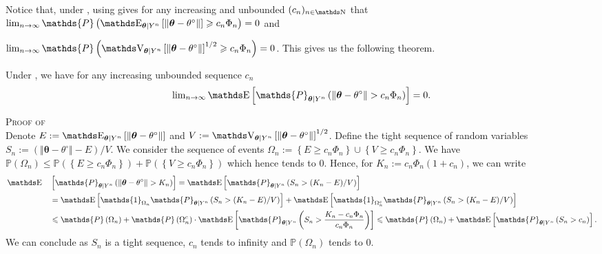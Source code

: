 Notice that, under , using  gives for any increasing and unbounded $(c_{n})_{n \in \N}$ that $\lim\nolimits_{n \rightarrow \infty} \mathds{P}\left(\E_{\boldsymbol{\theta} \vert Y^{n}}\left[\Vert \boldsymbol{\theta} - \theta^{\circ} \Vert \right] \geq c_{n}\Phi_{n}\right) = 0$ and

$\lim\nolimits_{n \rightarrow \infty} \mathds{P}\left(\V_{\boldsymbol{\theta} \vert Y^{n}}\left[\Vert \boldsymbol{\theta} - \theta^{\circ} \Vert \right]^{1/2} \geq c_{n}\Phi_{n}\right) = 0$.
This gives us the following theorem.

\begin{thm}\label{THM_BAYES_STRATEGIES_MOMENT}
Under , we have for any increasing unbounded sequence $c_{n}$
\[\lim\nolimits_{n \rightarrow \infty} \E\left[\mathds{P}_{\boldsymbol{\theta} \vert Y^{n}}\left(\Vert \boldsymbol{\theta} - \theta^{\circ} \Vert > c_{n}\Phi_{n} \right)\right] = 0.\]
\end{thm}

\begin{pro}\label{PRO_BAYES_STRATEGIES_MOMENT}{\textsc{Proof of }\\}
Denote $E := \E_{\boldsymbol{\theta} \vert Y^{n}}\left[\Vert \boldsymbol{\theta} - \theta^{\circ} \Vert\right]$ and $V := \V_{\boldsymbol{\theta} \vert Y^{n}}\left[\Vert \boldsymbol{\theta} - \theta^{\circ} \Vert\right]^{1/2}$.
Define the tight sequence of random variables $S_{n} := (\Vert \boldsymbol{\theta} - \theta^{\circ} \Vert - E)/V$.
We consider the sequence of events $\Omega_{n} := \left\{E \geq c_{n} \Phi_{n}\right\} \cup \left\{V \geq c_{n} \Phi_{n}\right\}$.
We have $\mathds{P}(\Omega_{n}) \leq \mathds{P}\left(\left\{E \geq c_{n} \Phi_{n}\right\}\right) + \mathds{P}\left(\left\{V \geq c_{n} \Phi_{n}\right\}\right)$ which hence tends to $0$.
Hence, for $K_{n} := c_{n} \Phi_{n} (1 + c_{n})$, we can write
\begin{alignat*}{2}
& \E && \left[\mathds{P}_{\boldsymbol{\theta} \vert Y^{n}}\left(\Vert \boldsymbol{\theta} - \theta^{\circ} \Vert > K_{n} \right)\right] = \E\left[\mathds{P}_{\boldsymbol{\theta} \vert Y^{n}}\left(S_{n} > (K_{n} - E)/V \right)\right]\\
& && = \E\left[\mathds{1}_{\Omega_{n}}\mathds{P}_{\boldsymbol{\theta} \vert Y^{n}}\left(S_{n} > (K_{n} - E)/V \right)\right] + \E\left[\mathds{1}_{\Omega_{n}^{c}}\mathds{P}_{\boldsymbol{\theta} \vert Y^{n}}\left(S_{n} > (K_{n} - E)/V \right)\right]\\
& && \leq \mathds{P}\left(\Omega_{n}\right) + \mathds{P}\left(\Omega_{n}^{c}\right) \cdot \E\left[\mathds{P}_{\boldsymbol{\theta} \vert Y^{n}}\left(S_{n} > \frac{K_{n} - c_{n} \Phi_{n}}{c_{n} \Phi_{n}} \right)\right] \leq \mathds{P}\left(\Omega_{n}\right) + \E\left[\mathds{P}_{\boldsymbol{\theta} \vert Y^{n}}\left(S_{n} > c_{n} \right)\right].
\end{alignat*}
We can conclude as $S_{n}$ is a tight sequence, $c_{n}$ tends to infinity and $\mathds{P}\left(\Omega_{n}\right)$ tends to $0$.
\proEnd
\end{pro}

